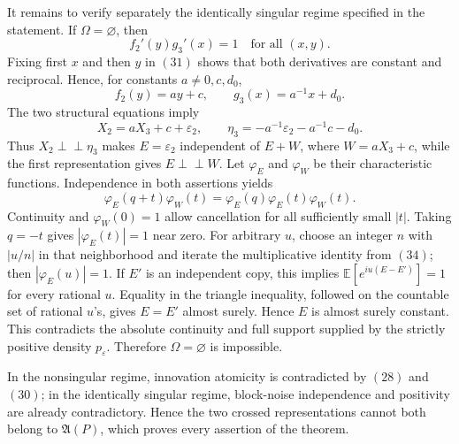 It remains to verify separately the identically singular regime specified in the statement.  If \(\Omega=\varnothing\), then
\[
 f_2'(y)g_3'(x)=1\quad\text{for all }(x,y).
\tag{31}
\]
Fixing first \(x\) and then \(y\) in \((31)\) shows that both derivatives are constant and reciprocal.  Hence, for constants \(a\ne0,c,d_0\),
\[
 f_2(y)=ay+c,
 \qquad
 g_3(x)=a^{-1}x+d_0.
\tag{32}
\]
The two structural equations imply
\[
 X_2=aX_3+c+\varepsilon_2,
 \qquad
 \eta_3=-a^{-1}\varepsilon_2-a^{-1}c-d_0.
\tag{33}
\]
Thus \(X_2\perp\!\!\!\perp\eta_3\) makes \(E=\varepsilon_2\) independent of \(E+W\), where \(W=aX_3+c\), while the first representation gives \(E\perp\!\!\!\perp W\).  Let \(\varphi_E\) and \(\varphi_W\) be their characteristic functions.  Independence in both assertions yields
\[
 \varphi_E(q+t)\varphi_W(t)
 =\varphi_E(q)\varphi_E(t)\varphi_W(t).
\tag{34}
\]
Continuity and \(\varphi_W(0)=1\) allow cancellation for all sufficiently small \(|t|\).  Taking \(q=-t\) gives \(|\varphi_E(t)|=1\) near zero.  For arbitrary \(u\), choose an integer \(n\) with \(|u/n|\) in that neighborhood and iterate the multiplicative identity from \((34)\); then \(|\varphi_E(u)|=1\).  If \(E'\) is an independent copy, this implies
\(\mathbb E[e^{iu(E-E')}]=1\) for every rational \(u\).  Equality in the triangle inequality, followed on the countable set of rational \(u\)'s, gives \(E=E'\) almost surely.  Hence \(E\) is almost surely constant.  This contradicts the absolute continuity and full support supplied by the strictly positive density \(p_\varepsilon\).  Therefore \(\Omega=\varnothing\) is impossible.

In the nonsingular regime, innovation atomicity is contradicted by \((28)\) and \((30)\); in the identically singular regime, block-noise independence and positivity are already contradictory.  Hence the two crossed representations cannot both belong to \(\mathfrak A(P)\), which proves every assertion of the theorem.